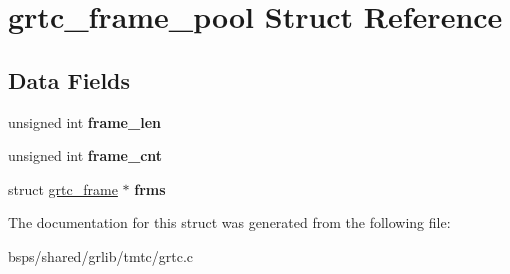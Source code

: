\hypertarget{structgrtc__frame__pool}{}\section{grtc\+\_\+frame\+\_\+pool Struct Reference}
\label{structgrtc__frame__pool}
\subsection*{Data Fields}
\begin{DoxyCompactItemize}
\item 
\mbox{\label{structgrtc__frame__pool_a04abe27b7ed3e9cf1ba9eca48af81322}} 
unsigned int {\bfseries frame\+\_\+len}
\item 
\mbox{\label{structgrtc__frame__pool_aa8b10d31c9170f4c9614fdba9c90b7e8}} 
unsigned int {\bfseries frame\+\_\+cnt}
\item 
\mbox{\label{structgrtc__frame__pool_ad98ea4378b0aa835391d7e91e8ffc51a}} 
struct \mbox{\hyperlink{structgrtc__frame}{grtc\+\_\+frame}} $\ast$ {\bfseries frms}
\end{DoxyCompactItemize}


The documentation for this struct was generated from the following file\+:\begin{DoxyCompactItemize}
\item 
bsps/shared/grlib/tmtc/grtc.\+c\end{DoxyCompactItemize}
